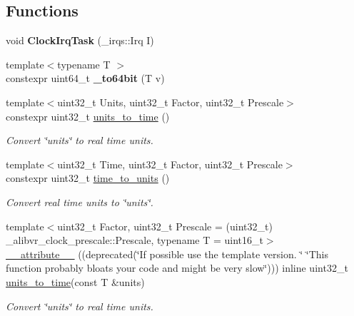 \subsection*{Functions}
\begin{DoxyCompactItemize}
\item 
\hypertarget{namespaceclock_aa67adb0b2215c44a4a770b6c36cfe8a7}{}\label{namespaceclock_aa67adb0b2215c44a4a770b6c36cfe8a7} 
void {\bfseries Clock\+Irq\+Task} (\+\_\+irqs\+::\+Irq I)
\item 
\hypertarget{namespaceclock_ac68f79977567f2ffe11ea30631653dd8}{}\label{namespaceclock_ac68f79977567f2ffe11ea30631653dd8} 
{\footnotesize template$<$typename T $>$ }\\constexpr uint64\+\_\+t {\bfseries \+\_\+to64bit} (T v)
\item 
{\footnotesize template$<$uint32\+\_\+t Units, uint32\+\_\+t Factor, uint32\+\_\+t Prescale$>$ }\\constexpr uint32\+\_\+t \hyperlink{namespaceclock_ae4ee0d04356b216b1d04046c0e1b2d38}{units\+\_\+to\+\_\+time} ()
\begin{DoxyCompactList}\small\item\em Convert \char`\"{}units\char`\"{} to real time units. \end{DoxyCompactList}\item 
{\footnotesize template$<$uint32\+\_\+t Time, uint32\+\_\+t Factor, uint32\+\_\+t Prescale$>$ }\\constexpr uint32\+\_\+t \hyperlink{namespaceclock_ac6b5f264784ea96fd8629fec0c0f7131}{time\+\_\+to\+\_\+units} ()
\begin{DoxyCompactList}\small\item\em Convert real time units to \char`\"{}units\char`\"{}. \end{DoxyCompactList}\item 
{\footnotesize template$<$uint32\+\_\+t Factor, uint32\+\_\+t Prescale = (uint32\+\_\+t) \+\_\+alibvr\+\_\+clock\+\_\+prescale\+::\+Prescale, typename T  = uint16\+\_\+t$>$ }\\\hyperlink{namespaceclock_aaadef4e91948a79985a42ebbd57fe2d1}{\+\_\+\+\_\+attribute\+\_\+\+\_\+} ((deprecated(\char`\"{}If possible use the template version.  \char`\"{} \char`\"{}This function probably bloats your code and might be very slow\char`\"{}))) inline uint32\+\_\+t \hyperlink{namespaceclock_ae4ee0d04356b216b1d04046c0e1b2d38}{units\+\_\+to\+\_\+time}(const T \&units)
\begin{DoxyCompactList}\small\item\em Convert \char`\"{}units\char`\"{} to real time units. \end{DoxyCompactList}\item 

\end{DoxyCompactItemize}
